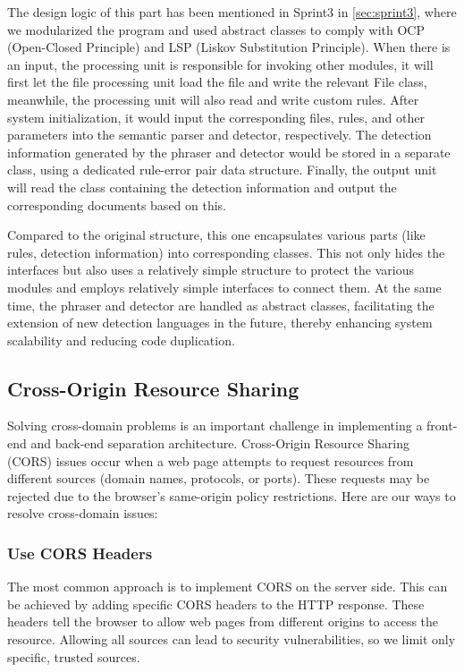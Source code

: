 \documentclass[journal]{IEEEtran}
\begin{document}
The design logic of this part has been mentioned in Sprint3 in \ref{sec:sprint3}, where we modularized the program and used abstract classes to comply with OCP (Open-Closed Principle) and LSP (Liskov Substitution Principle). When there is an input, the processing unit is responsible for invoking other modules, it will first let the file processing unit load the file and write the relevant File class, meanwhile, the processing unit will also read and write custom rules. After system initialization, it would input the corresponding files, rules, and other parameters into the semantic parser and detector, respectively. The detection information generated by the phraser and detector would be stored in a separate class, using a dedicated rule-error pair data structure. Finally, the output unit will read the class containing the detection information and output the corresponding documents based on this.

Compared to the original structure, this one encapsulates various parts (like rules, detection information) into corresponding classes. This not only hides the interfaces but also uses a relatively simple structure to protect the various modules and employs relatively simple interfaces to connect them. At the same time, the phraser and detector are handled as abstract classes, facilitating the extension of new detection languages in the future, thereby enhancing system scalability and reducing code duplication.

\subsection{Cross-Origin Resource Sharing}
Solving cross-domain problems is an important challenge in implementing a front-end and back-end separation architecture. Cross-Origin Resource Sharing (CORS) issues occur when a web page attempts to request resources from different sources (domain names, protocols, or ports). These requests may be rejected due to the browser's same-origin policy restrictions. Here are our ways to resolve cross-domain issues:

\subsubsection{Use CORS Headers}
The most common approach is to implement CORS on the server side. This can be achieved by adding specific CORS headers to the HTTP response. These headers tell the browser to allow web pages from different origins to access the resource. Allowing all sources can lead to security vulnerabilities, so we limit only specific, trusted sources.
\end{document}
